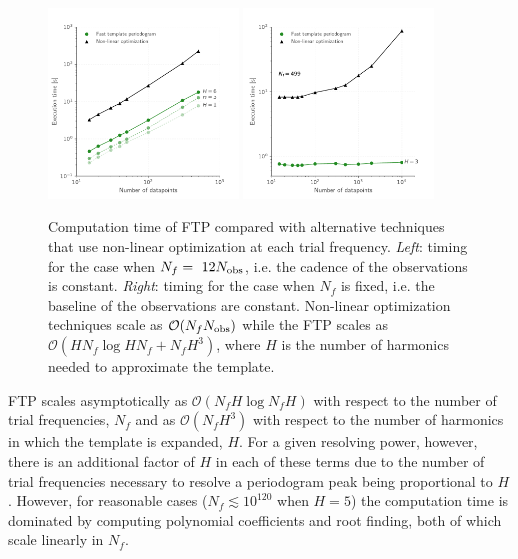 \documentclass[apj]{emulateapj}
\newcommand{\bigO}{\mathcal{O}}
\begin{document}
\begin{figure}
    \centering
    \includegraphics[width=0.45\textwidth]{plots/timing_vs_ndata.pdf}
    \includegraphics[width=0.45\textwidth]{plots/timing_vs_ndata_const_freq.pdf}
    \caption{\label{fig:timingndata} Computation time of FTP compared with alternative techniques
             that use non-linear optimization at each trial frequency. \emph{Left}: timing for the
             case when $N_f = ~12 N_{\rm obs}$, i.e. the cadence of the observations is constant.
             \emph{Right}: timing for the case when $N_f$ is fixed, i.e. the baseline of the observations
             are constant. Non-linear optimization techniques scale as $\bigO(N_f N_{\rm obs})$ while
             the FTP scales as $\bigO(HN_f\log HN_f + N_fH^3)$, where $H$ is the number of harmonics
             needed to approximate the template.}

\end{figure}

FTP scales asymptotically as $\bigO(N_fH\log N_fH)$ with respect to the number of trial frequencies,
$N_f$ and as $\bigO(N_fH^3)$ with respect to the number of harmonics in which the template is expanded, $H$.
For a given resolving power, however, there is an additional factor of $H$ in each of these terms due to the
number of trial frequencies necessary to resolve a periodogram peak being proportional to $H$.
However, for reasonable cases ($N_f \lesssim 10^{120}$ when $H=5$) the computation time is dominated by
computing polynomial coefficients and root finding, both of which scale linearly in $N_f$.
\end{document}
